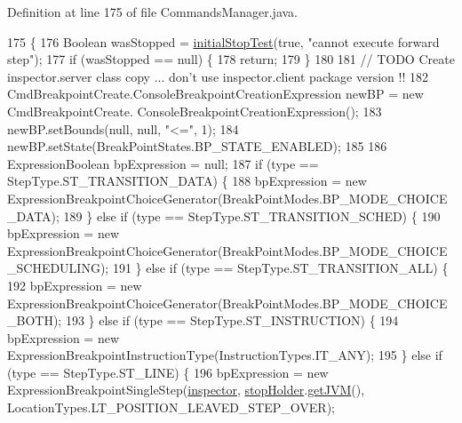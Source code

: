 Definition at line 175 of file Commands\+Manager.\+java.


\begin{DoxyCode}
175                                                                                    \{
176     Boolean wasStopped = \hyperlink{classgov_1_1nasa_1_1jpf_1_1inspector_1_1server_1_1breakpoints_1_1_commands_manager_afe4795e1382183ef74cf03ea0b277c13}{initialStopTest}(\textcolor{keyword}{true}, \textcolor{stringliteral}{"cannot execute forward step"});
177     \textcolor{keywordflow}{if} (wasStopped == null) \{
178       \textcolor{keywordflow}{return};
179     \}
180 
181     \textcolor{comment}{// TODO Create inspector.server class copy ... don't use inspector.client package version !!}
182     CmdBreakpointCreate.ConsoleBreakpointCreationExpression newBP = \textcolor{keyword}{new} CmdBreakpointCreate.
      ConsoleBreakpointCreationExpression();
183     newBP.setBounds(null, null, \textcolor{stringliteral}{"<="}, 1);
184     newBP.setState(BreakPointStates.BP\_STATE\_ENABLED);
185 
186     ExpressionBoolean bpExpression = null;
187     \textcolor{keywordflow}{if} (type == StepType.ST\_TRANSITION\_DATA) \{
188       bpExpression = \textcolor{keyword}{new} ExpressionBreakpointChoiceGenerator(BreakPointModes.BP\_MODE\_CHOICE\_DATA);
189     \} \textcolor{keywordflow}{else} \textcolor{keywordflow}{if} (type == StepType.ST\_TRANSITION\_SCHED) \{
190       bpExpression = \textcolor{keyword}{new} ExpressionBreakpointChoiceGenerator(BreakPointModes.BP\_MODE\_CHOICE\_SCHEDULING);
191     \} \textcolor{keywordflow}{else} \textcolor{keywordflow}{if} (type == StepType.ST\_TRANSITION\_ALL) \{
192       bpExpression = \textcolor{keyword}{new} ExpressionBreakpointChoiceGenerator(BreakPointModes.BP\_MODE\_CHOICE\_BOTH);
193     \} \textcolor{keywordflow}{else} \textcolor{keywordflow}{if} (type == StepType.ST\_INSTRUCTION) \{
194       bpExpression = \textcolor{keyword}{new} ExpressionBreakpointInstructionType(InstructionTypes.IT\_ANY);
195     \} \textcolor{keywordflow}{else} \textcolor{keywordflow}{if} (type == StepType.ST\_LINE) \{
196       bpExpression = \textcolor{keyword}{new} ExpressionBreakpointSingleStep(\hyperlink{classgov_1_1nasa_1_1jpf_1_1inspector_1_1server_1_1breakpoints_1_1_commands_manager_a281675efc13e0f7e311b76bc7590a6ec}{inspector}, 
      \hyperlink{classgov_1_1nasa_1_1jpf_1_1inspector_1_1server_1_1breakpoints_1_1_commands_manager_a3573f950aba2548e59f2c4f7c193b307}{stopHolder}.\hyperlink{classgov_1_1nasa_1_1jpf_1_1inspector_1_1server_1_1jpf_1_1_stop_holder_a61538f1b06885ad49eabf9d5fd10e254}{getJVM}(), LocationTypes.LT\_POSITION\_LEAVED\_STEP\_OVER);

\end{DoxyCode}
